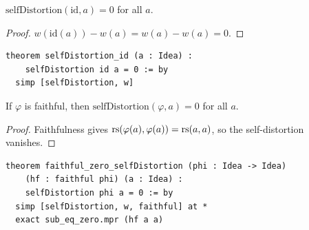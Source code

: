 \begin{theorem}
\label{thm:self-distortion-id}
$\mathrm{selfDistortion}(\mathrm{id}, a) = 0$ for all $a$.
\end{theorem}

\begin{proof}
$w(\mathrm{id}(a)) - w(a) = w(a) - w(a) = 0$.
\end{proof}

\begin{lstlisting}
theorem selfDistortion_id (a : Idea) :
    selfDistortion id a = 0 := by
  simp [selfDistortion, w]
\end{lstlisting}

\begin{theorem}
\label{thm:faithful-zero-self-distortion}
If $\varphi$ is faithful, then $\mathrm{selfDistortion}(\varphi, a) = 0$
for all $a$.
\end{theorem}

\begin{proof}
Faithfulness gives $\mathrm{rs}(\varphi(a), \varphi(a)) = \mathrm{rs}(a, a)$, so the
self-distortion vanishes.
\end{proof}

\begin{lstlisting}
theorem faithful_zero_selfDistortion (phi : Idea -> Idea)
    (hf : faithful phi) (a : Idea) :
    selfDistortion phi a = 0 := by
  simp [selfDistortion, w, faithful] at *
  exact sub_eq_zero.mpr (hf a a)
\end{lstlisting}

